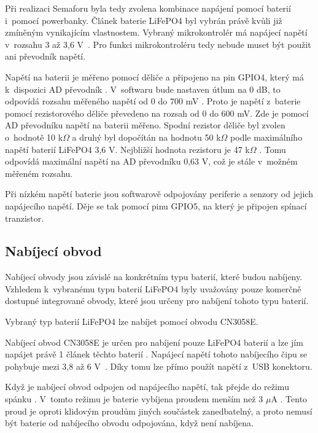 Při realizaci Semaforu byla tedy zvolena kombinace napájení pomocí baterií i~pomocí powerbanky. Článek baterie LiFePO4 byl vybrán právě kvůli již zmíněným vynikajícím 
vlastnostem. Vybraný mikrokontrolér má napájecí napětí v~rozsahu 3 až 3,6 V~\cite{ESP_C3_dtsh}. Pro funkci mikrokontroléru tedy nebude muset být použit ani 
převodník napětí. 

Napětí na baterii je měřeno pomocí děliče a připojeno na pin GPIO4, který má k~dispozici AD převodník \cite{ESP_C3_dtsh}. V~softwaru bude nastaven útlum na 0 dB, to 
odpovídá rozsahu měřeného napětí od 0 do 700 mV \cite{ESP_C3_tech_ref}.
Proto je napětí z~baterie pomocí rezistorového děliče převedeno na rozsah od 0 do 600 mV. Zde je pomocí AD převodníku napětí na baterii měřeno. Spodní rezistor děliče byl
zvolen o~hodnotě 10 k$\Omega$ a druhý byl dopočítán na hodnotu 50 k$\Omega$ podle maximálního napětí baterií LiFePO4 3,6 V. Nejbližší hodnota rezistoru je 47 k$\Omega$
\cite{rezistorova_rada}. Tomu odpovídá maximální napětí na AD převodníku 0,63 V, což je stále v~možném měřeném rozsahu. 

Při nízkém napětí baterie jsou softwarově odpojovány periferie a senzory od jejich napájecího napětí. Děje se tak pomocí pinu GPIO5, na který je připojen spínací 
tranzistor.

\subsection{Nabíjecí obvod}
Nabíjecí obvody jsou závislé na konkrétním typu baterií, které budou nabíjeny. Vzhledem k~vybranému typu baterií LiFePO4 byly uvažovány pouze komerčně
dostupné integrované obvody, které jsou určeny pro nabíjení tohoto typu baterií. 

Vybraný typ baterií LiFePO4 lze nabíjet pomocí obvodu CN3058E. 

Nabíjecí obvod CN3058E je určen pro nabíjení pouze LiFePO4 baterií a lze jím napájet právě 1 článek těchto baterií \cite{charger_dtsh}. Napájecí napětí tohoto 
nabíjecího čipu se pohybuje mezi 3,8 až 6 V~\cite{charger_dtsh}. Díky tomu lze přímo použít napětí z~USB konektoru. 

Když je nabíjecí obvod odpojen od napájecího napětí, tak přejde do režimu spánku \cite{charger_dtsh}. V~tomto režimu je baterie vybíjena proudem menším než 
3 $\mu$A \cite{charger_dtsh}. Tento proud je oproti klidovým proudům jiných součástek zanedbatelný, a proto nemusí být baterie od nabíjecího obvodu odpojována,
když není nabíjena. 

